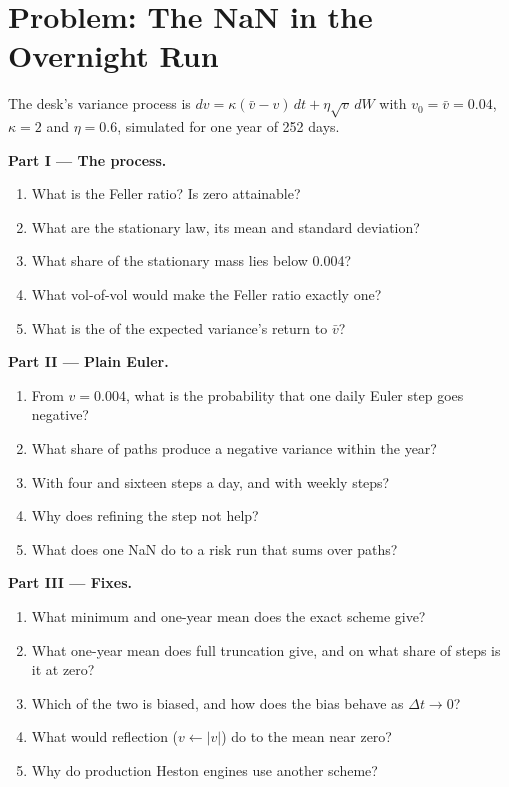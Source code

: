 \section{Problem: The NaN in the Overnight Run}

\begin{problem}\label{pb:qm:stochastic-differential-equations:1}
The desk's variance process is $dv = \kappa(\bar v - v)\,dt + \eta\sqrt v\,dW$ with $v_0 = \bar v = 0.04$,
$\kappa = 2$ and $\eta = 0.6$, simulated for one year of 252 days.

\medskip\noindent\textbf{Part I --- The process.}
\begin{enumerate}
\item What is the Feller ratio? Is zero attainable?
\item What are the stationary law, its mean and standard deviation?
\item What share of the stationary mass lies below 0.004?
\item What vol-of-vol would make the Feller ratio exactly one?
\item What is the  of the expected variance's return to $\bar v$?
\end{enumerate}

\medskip\noindent\textbf{Part II --- Plain Euler.}
\begin{enumerate}[resume]
\item From $v = 0.004$, what is the probability that one daily Euler step goes negative?
\item What share of paths produce a negative variance within the year?
\item With four and sixteen steps a day, and with weekly steps?
\item Why does refining the step not help?
\item What does one NaN do to a risk run that sums over paths?
\end{enumerate}

\medskip\noindent\textbf{Part III --- Fixes.}
\begin{enumerate}[resume]
\item What minimum and one-year mean does the exact scheme give?
\item What one-year mean does full truncation give, and on what share of steps is it at zero?
\item Which of the two is biased, and how does the bias behave as $\Delta t \to 0$?
\item What would reflection ($v \leftarrow |v|$) do to the mean near zero?
\item Why do production Heston engines use another scheme?
\end{enumerate}


\end{problem}
